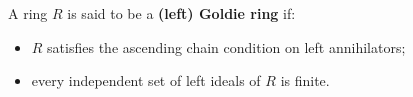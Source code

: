 A ring $R$ is said to be a \textbf{(left) Goldie ring} if:
\begin{itemize}
\item[(i)] $R$ satisfies the ascending chain condition on left annihilators;
\item[(ii)] every independent set of left ideals of $R$ is finite.
\end{itemize}
